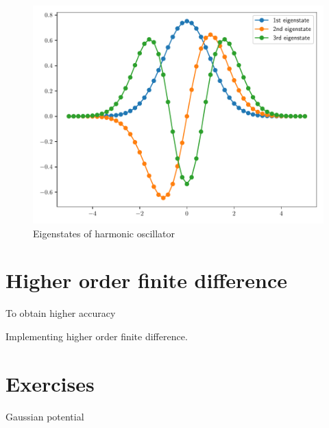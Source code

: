 \begin{figure}[H]
{\center
\includegraphics[scale=0.65]{../codes/sch_1d/IMG_main_harmonic_01_51.pdf}
\par}
\caption{Eigenstates of harmonic oscillator}
\end{figure}


\section{Higher order finite difference}

To obtain higher accuracy

Implementing higher order finite difference.


\section{Exercises}

Gaussian potential

